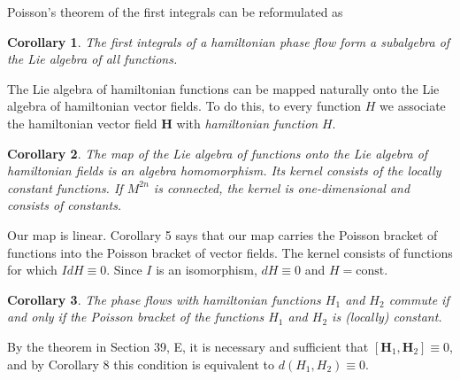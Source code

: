 \documentclass[leqno]{report}
\numberwithin{equation}{section}
\theoremstyle{plain}
\newtheorem{cor}{Corollary}
\let\oldendproof\endproof
\renewenvironment{proof}[1][\proofname]{%
  \oldproof[\textsc{#1}]%
}{\oldendproof}
\theoremstyle{definition}
\theoremstyle{remark}
\theoremstyle{smallcap}
\numberwithin{prob}{section}
\begin{document}
Poisson's theorem of the first integrals
can be reformulated as

\begin{cor}
  The first integrals of a hamiltonian phase flow
  form a subalgebra of the Lie algebra of all functions.
\end{cor}

The Lie algebra of hamiltonian functions can be
mapped naturally onto the Lie algebra of hamiltonian
vector fields.
%
To do this, to every function $H$ we associate the hamiltonian
vector field $\mathbf H$ with \emph{hamiltonian function} $H$.

\begin{cor}
  The map of the Lie algebra of functions
  onto the Lie algebra of hamiltonian fields
  is an algebra homomorphism.
  Its kernel consists of the locally constant
  functions.
  If $M^{2n}$ is connected,
  the kernel is one-dimensional and consists of constants.
\end{cor}


\begin{proof}
  Our map is linear. Corollary 5 says that our map carries
  the Poisson bracket of functions into the Poisson bracket
  of vector fields. The kernel consists of functions
  for which $IdH \equiv 0$.
  Since $I$ is an isomorphism, $dH \equiv 0$ and $H = \mathrm{const}$.
\end{proof}

\begin{cor}
  The phase flows with hamiltonian functions $H_1$ and $H_2$
  commute if and only if the Poisson bracket of the functions
  $H_1$ and $H_2$ is (locally) constant.
\end{cor}

\begin{proof}
  By the theorem in Section 39, E, it is necessary and sufficient
  that $[\mathbf H_1, \mathbf H_2] \equiv 0$,
  and by Corollary 8 this condition is equivalent to
  $d(H_1, H_2) \equiv 0$.
\end{proof}
\end{document}
